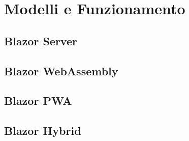 \chapter{Modelli e Funzionamento}\label{cap:modefunz}
\section{Blazor Server}\label{sez:bserver}
\section{Blazor WebAssembly}\label{sez:bclient}
\section{Blazor PWA}\label{sez:bpwa}
\section{Blazor Hybrid}\label{sez:bhybrid}
